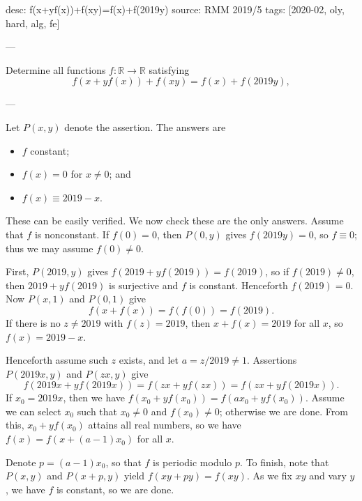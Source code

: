 desc: f(x+yf(x))+f(xy)=f(x)+f(2019y)
source: RMM 2019/5
tags: [2020-02, oly, hard, alg, fe]

---

Determine all functions $f:\mathbb R\to\mathbb R$ satisfying \[f(x+yf(x))+f(xy)=f(x)+f(2019y),\]

---

Let $P(x,y)$ denote the assertion. The answers are
\begin{itemize}[itemsep=0em]
    \item $f$ constant;
    \item $f(x)=0$ for $x\ne0$; and
    \item $f(x)\equiv 2019-x$.
\end{itemize}
These can be easily verified. We now check these are the only answers. Assume that $f$ is nonconstant. If $f(0)=0$, then $P(0,y)$ gives $f(2019y)=0$, so $f\equiv0$; thus we may assume $f(0)\ne0$.

First, $P(2019,y)$ gives $f(2019+yf(2019))=f(2019)$, so if $f(2019)\ne0$, then $2019+yf(2019)$ is surjective and $f$ is constant. Henceforth $f(2019)=0$. Now $P(x,1)$ and $P(0,1)$ give \[f(x+f(x))=f(f(0))=f(2019).\]
If there is no $z\ne2019$ with $f(z)=2019$, then $x+f(x)=2019$ for all $x$, so $f(x)=2019-x$.

Henceforth assume such $z$ exists, and let $a=z/2019\ne1$. Assertions $P(2019x,y)$ and $P(zx,y)$ give \[f(2019x+yf(2019x))=f(zx+yf(zx))=f(zx+yf(2019x)).\]
If $x_0=2019x$, then we have $f(x_0+yf(x_0))=f(ax_0+yf(x_0))$. Assume we can select $x_0$ such that $x_0\ne0$ and $f(x_0)\ne0$; otherwise we are done. From this, $x_0+yf(x_0)$ attains all real numbers, so we have $f(x)=f(x+(a-1)x_0)$ for all $x$.

Denote $p=(a-1)x_0$, so that $f$ is periodic modulo $p$. To finish, note that $P(x,y)$ and $P(x+p,y)$ yield $f(xy+py)=f(xy)$. As we fix $xy$ and vary $y$, we have $f$ is constant, so we are done.
